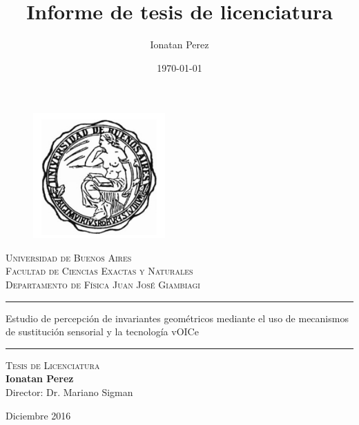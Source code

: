 \documentclass{article}
\title{Informe de tesis de licenciatura}
\author{Ionatan Perez}
\date{\today}
\numberwithin{figure}{section}
\begin{document}
\thispagestyle{empty}

\begin{center}

 \begin{figure}[htb]
\centering
\includegraphics[width=0.45\textwidth]{./logo}
\end{figure} 



\textsc{\LARGE Universidad de Buenos Aires}\\[0.5cm]
\textsc{\large Facultad de Ciencias Exactas y Naturales}\\[0.5cm]

\textsc{  Departamento de Física Juan José Giambiagi}\\[0.5cm]


\rule[1em]{40em}{0.5pt}
\begin{center}
\huge Estudio de percepción de invariantes geométricos mediante el uso de mecanismos de sustitución sensorial y la tecnología vOICe

\end{center}


\rule[1em]{40em}{0.5pt}



\textsc{\large Tesis de Licenciatura}\\[1cm]

{\Large \textbf{
Ionatan Perez}} \\ [1cm]

\Large
Director: Dr. Mariano Sigman\\[0.5cm]

\vfill

Diciembre 2016
\end{center}
\end{document}
